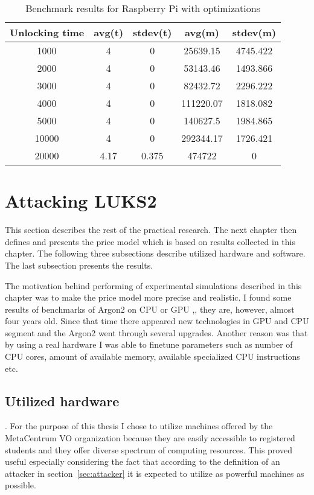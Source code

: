 \documentclass[nolof]{fithesis3}
\begin{document}
\noindent
\begin{table}
\caption{Benchmark results for Raspberry Pi with optimizations}
\label{tab:r4c1go}
\begin{tabularx}{\textwidth}{| c | c | c | c | c |}
\hline
Unlocking time & avg(t) & stdev(t) & avg(m) & stdev(m)\\
\hline
1000 & 4 & 0 & 25639.15 & 4745.422\\
\hline
2000 & 4 & 0 & 53143.46 & 1493.866\\
\hline
3000 & 4 & 0 & 82432.72 & 2296.222\\
\hline
4000 & 4 & 0 & 111220.07 & 1818.082\\
\hline
5000 & 4 & 0 & 140627.5 & 1984.865\\
\hline
10000 & 4 & 0 & 292344.17 & 1726.421\\
\hline
20000 & 4.17 & 0.375 & 474722 & 0\\
\hline
\end{tabularx}
\end{table}


\FloatBarrier

\section{Attacking LUKS2}
\label{sec:attack}
This section describes the rest of the practical research. The next chapter then defines and presents the price model which is based on results collected in this chapter. The following three subsections describe utilized hardware and software. The last subsection presents the results.

The motivation behind performing of experimental simulations described in this chapter was to make the price model more precise and realistic. I found some results of benchmarks of Argon2 on CPU or GPU \parencite{argon2gpuold},, they are, however, almost four years old. Since that time there appeared new technologies in GPU and CPU segment and the Argon2 went through several upgrades. Another reason was that  by using a real hardware I was able to finetune parameters such as number of CPU cores, amount of available memory, available specialized CPU instructions etc.

\subsection{Utilized hardware}
. For the purpose of this thesis I chose to utilize machines offered by the MetaCentrum VO organization because they are easily accessible to registered students and they offer diverse spectrum of computing resources. This proved useful especially considering the fact that according to the definition of an attacker in section~\ref{sec:attacker} it is expected to utilize as powerful machines as possible.
\end{document}
